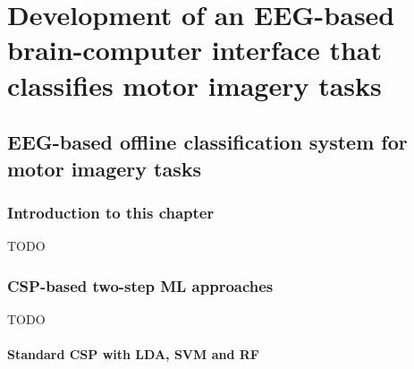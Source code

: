 





\part{Development of an EEG-based brain-computer interface that classifies motor imagery tasks}
\label{part:development}

\chapter{EEG-based offline classification system for motor imagery tasks}
\label{ch:offline_bci_system}

\section{Introduction to this chapter}
\label{sec:offline_bci_system_introduction}

TODO

\section{CSP-based two-step ML approaches}
\label{sec:offline_bci_system_two_step_ml}

TODO


\subsection{Standard CSP with LDA, SVM and RF}
\label{subsec:offline_bci_system_two_step_ml_basic_csp}

